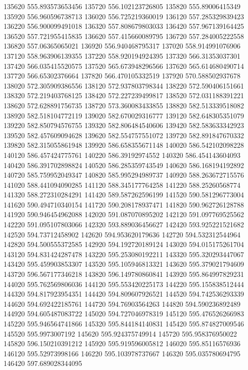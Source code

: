 {135620 555.893573653456
135720 556.102123726805
135820 555.89006415349
135920 556.960596738713
136020 556.725219360019
136120 557.285329839423
136220 556.900099491018
136320 557.808679803033
136420 557.967139164425
136520 557.721955415835
136620 557.415660089795
136720 557.284005222558
136820 557.06365065021
136920 556.940468795317
137020 558.914991076906
137120 558.963906139355
137220 558.920194924395
137320 566.31353037301
137420 566.035415520575
137520 565.673948296566
137620 565.614680490714
137720 566.65302376664
137820 566.470105332519
137920 570.588502937678
138020 572.305909386556
138120 572.937803798344
138220 572.590406151661
138320 572.219403768125
138420 572.227239499817
138520 572.031188391221
138620 572.628891756735
138720 573.360083433855
138820 582.513339518082
138920 582.518104772119
139020 582.670029316777
139120 582.648305351079
139220 582.850794576755
139320 582.806484540606
139420 582.583633342923
139520 582.457609094628
139620 582.554757551072
139720 582.891847670332
139820 582.315055861948
139920 586.658355671148
140020 586.542102098228
140120 586.457424775761
140220 586.39192974552
140320 586.454143604093
140420 586.391702898824
140520 586.285359743549
140620 586.168194192892
140720 585.759952049347
140820 585.995294989737
140920 588.263672715576
141020 588.441094090285
141120 588.345177764258
141220 588.25260568774
141320 588.272310284291
141420 589.587262596199
141520 590.581296773004
141620 590.494710340154
141720 590.208178937471
141820 590.962726128788
141920 590.946454962088
142020 591.087070895202
142120 591.097769525562
142220 591.095107803066
142320 593.889036456627
142420 593.925221521682
142520 594.73712458902
142620 594.953620179636
142720 594.532312544964
142820 594.500555372585
142920 594.192720189124
143020 594.015175261704
143120 594.831424287478
143220 595.253080192211
143320 595.320293447067
143420 595.459903853307
143520 595.105946813321
143620 595.379021794609
143720 596.567177346218
143820 596.149780860841
143920 595.864997829231
144020 595.762569806036
144120 595.553420225173
144220 595.155838512444
144320 594.817923954351
144420 594.809607926521
144520 594.742536293339
144620 594.692422185761
144720 594.76903564263
144820 594.590236892489
144920 594.605487083722
145020 594.727046978319
145120 595.476526266983
145220 595.946564741866
145320 595.844184140831
145420 595.874827009546
145520 595.9973007192
145620 595.924375749914
145720 595.958376950022
145820 596.150210391212
145920 595.919596005812
146020 595.85116576936
146120 595.52973998166
146220 595.103978737667
146320 595.035780694795
146420 597.689028344095
}
